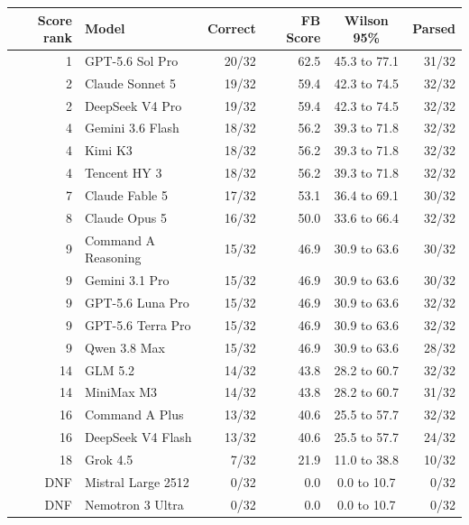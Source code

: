 \begin{tabular}{@{}r l r r c r@{}}
\toprule
Score rank & Model & Correct & FB Score & Wilson 95\% & Parsed \\
\midrule
1 & GPT-5.6 Sol Pro & 20/32 & 62.5 & 45.3 to 77.1 & 31/32 \\
2 & Claude Sonnet 5 & 19/32 & 59.4 & 42.3 to 74.5 & 32/32 \\
2 & DeepSeek V4 Pro & 19/32 & 59.4 & 42.3 to 74.5 & 32/32 \\
4 & Gemini 3.6 Flash & 18/32 & 56.2 & 39.3 to 71.8 & 32/32 \\
4 & Kimi K3 & 18/32 & 56.2 & 39.3 to 71.8 & 32/32 \\
4 & Tencent HY 3 & 18/32 & 56.2 & 39.3 to 71.8 & 32/32 \\
7 & Claude Fable 5 & 17/32 & 53.1 & 36.4 to 69.1 & 30/32 \\
8 & Claude Opus 5 & 16/32 & 50.0 & 33.6 to 66.4 & 32/32 \\
9 & Command A Reasoning & 15/32 & 46.9 & 30.9 to 63.6 & 30/32 \\
9 & Gemini 3.1 Pro & 15/32 & 46.9 & 30.9 to 63.6 & 30/32 \\
9 & GPT-5.6 Luna Pro & 15/32 & 46.9 & 30.9 to 63.6 & 32/32 \\
9 & GPT-5.6 Terra Pro & 15/32 & 46.9 & 30.9 to 63.6 & 32/32 \\
9 & Qwen 3.8 Max & 15/32 & 46.9 & 30.9 to 63.6 & 28/32 \\
14 & GLM 5.2 & 14/32 & 43.8 & 28.2 to 60.7 & 32/32 \\
14 & MiniMax M3 & 14/32 & 43.8 & 28.2 to 60.7 & 31/32 \\
16 & Command A Plus & 13/32 & 40.6 & 25.5 to 57.7 & 32/32 \\
16 & DeepSeek V4 Flash & 13/32 & 40.6 & 25.5 to 57.7 & 24/32 \\
18 & Grok 4.5 & 7/32 & 21.9 & 11.0 to 38.8 & 10/32 \\
DNF & Mistral Large 2512 & 0/32 & 0.0 & 0.0 to 10.7 & 0/32 \\
DNF & Nemotron 3 Ultra & 0/32 & 0.0 & 0.0 to 10.7 & 0/32 \\
\bottomrule
\end{tabular}
